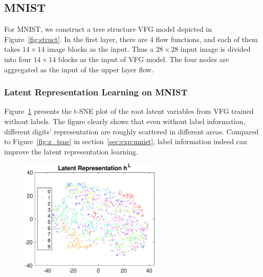\documentclass{article}
\begin{document}
\subsection{MNIST}
For MNIST, we construct a tree structure VFG model depicted in Figure~\ref{fig:struct}.  
In the first layer, there are 4 flow functions, and each of them takes $14\times 14$ image blocks as the input. 
Thus a $28\times 28$ input image is divided into four $14\times 14$ blocks as the input of VFG model. 
The four nodes are aggregated as the input of the upper layer flow. 


\subsubsection{Latent Representation Learning on MNIST}
Figure~\ref{fig:z_no_Y} presents the t-SNE plot of the root latent variables from VFG trained without labels. The figure clearly shows that even without label information, different digits' representation are roughly scattered in different areas.  Compared to Figure~\ref{fig:z_tsne} in section~\ref{sec:exp:mnist}, label information indeed can improve the latent representation learning. 
\begin{figure}[H]
    \centering
       \includegraphics[width=0.6\textwidth]{fig/z_no_Y_2.eps} 
    \label{fig:z_no_Y}
\end{figure}
 
\end{document}
